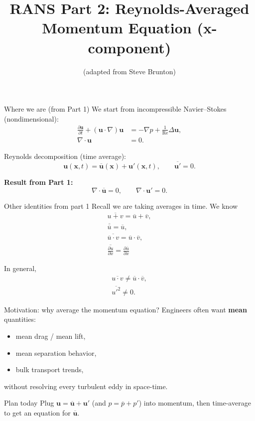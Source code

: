 \documentclass[aspectratio=169]{beamer}
\title[RANS II: Momentum]{RANS Part 2: Reynolds-Averaged Momentum Equation (x-component)}
\author{(adapted from Steve Brunton)}
\date{}
\newcommand{\x}{\bm{x}}
\newcommand{\uu}{\bm{u}}
\newcommand{\pp}{p}
\newcommand{\Rey}{\mathrm{Re}}
\newcommand{\avg}[1]{\overline{#1}}
\newcommand{\up}{\uu'}
\newcommand{\ubar}{\avg{\uu}}
\newcommand{\grad}{\nabla}
\newcommand{\Div}{\nabla\cdot}
\newcommand{\Lap}{\Delta}
\begin{document}
\begin{frame}
  \titlepage
\end{frame}

\begin{frame}{Where we are (from Part 1)}
We start from incompressible Navier--Stokes (nondimensional):
\begin{align*}
\frac{\partial \uu}{\partial t}  + (\uu\cdot\grad)\uu &= -\grad \pp + \frac{1}{\Rey}\Lap\uu,\\
\Div\uu &= 0.
\end{align*}

Reynolds decomposition (time average):
\[
\uu(\x,t)=\ubar(\x)+\up(\x,t),\qquad \avg{\up}=0.
\]

\textbf{Result from Part 1:}
\[
\Div\ubar=0,\qquad \Div\up=0.
\]
\end{frame}

\begin{frame}{Other identities from part 1}
Recall we are taking averages in time. We know \\
\begin{align*}
\avg{u+v}=\avg{u}+\avg{v},\\
\avg{\avg{u}}=\avg{u},\\
\avg{\avg{u}\cdot v}=\avg{u}\cdot \avg{v},\\
\avg{\frac{\partial u}{\partial x}}=\frac{\partial \avg{u}}{\partial x}
\end{align*}

In general, 
\begin{align*}
\avg{u\cdot v}\neq \avg{u}\cdot \avg{v},\\
\avg{u'^2}\neq 0.
\end{align*}
\end{frame}
\begin{frame}{Motivation: why average the momentum equation?}
Engineers often want \textbf{mean} quantities:
\begin{itemize}
  \item mean drag / mean lift,
  \item mean separation behavior,
  \item bulk transport trends,
\end{itemize}
without resolving every turbulent eddy in space-time.

\begin{block}{Plan today}
Plug $\uu=\ubar+\up$ (and $\pp=\avg{\pp}+\pp'$) into momentum,
then time-average to get an equation for $\ubar$.
\end{block}
\end{frame}
\end{document}
